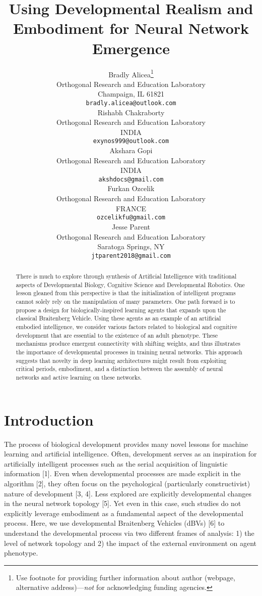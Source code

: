 \documentclass{article}
\title{Using Developmental Realism and Embodiment for Neural Network Emergence}
\author{%
  Bradly Alicea\thanks{Use footnote for providing further information
    about author (webpage, alternative address)---\emph{not} for acknowledging
    funding agencies.} \\
  Orthogonal Research and Education Laboratory\\
  Champaign, IL 61821 \\
  \texttt{bradly.alicea@outlook.com} \\
\And
  Rishabh Chakraborty \\
  Orthogonal Research and Education Laboratory \\
  INDIA \\
   \texttt{exynos999@outlook.com} \\
\And
  Akshara Gopi \\
  Orthogonal Research and Education Laboratory \\
  INDIA \\
   \texttt{akshdocs@gmail.com} \\
\And
  Furkan Ozcelik \\
  Orthogonal Research and Education Laboratory \\
  FRANCE \\
   \texttt{ozcelikfu@gmail.com} \\
\And
  Jesse Parent \\
  Orthogonal Research and Education Laboratory \\
  Saratoga Springs, NY \\
   \texttt{jtparent2018@gmail.com} \\
\AND

}
\begin{document}
\maketitle

\begin{abstract}
There is much to explore through synthesis of Artificial Intelligence with traditional aspects of Developmental Biology, Cognitive Science and Developmental Robotics. One lesson gleaned from this perspective is that the initialization of intelligent programs cannot solely rely on the manipulation of many parameters. One path forward is to propose a design for biologically-inspired learning agents that expands upon the classical Braitenberg Vehicle. Using these agents as an example of an artificial embodied intelligence, we consider various factors related to biological and cognitive development that are essential to the existence of an adult phenotype. These mechanisms produce emergent connectivity with shifting weights, and thus illustrates the importance of developmental processes in training neural networks. This approach suggests that novelty in deep learning architectures might result from exploiting critical periods, embodiment, and a distinction between the assembly of neural networks and active learning on these networks.
\end{abstract}

\section{Introduction}

The process of biological development provides many novel lessons for machine learning and artificial intelligence. Often, development serves as an inspiration for artificially intelligent processes such as the serial acquisition of linguistic information [1]. Even when developmental processes are made explicit in the algorithm [2], they often focus on the psychological (particularly constructivist) nature of development [3, 4]. Less explored are explicitly developmental changes in the neural network topology [5]. Yet even in this case, such studies do not explicitly leverage embodiment as a fundamental aspect of the developmental process. Here, we use developmental Braitenberg Vehicles (dBVs) [6] to understand the developmental process via two different frames of analysis: 1) the level of network topology and 2) the impact of the external environment on agent phenotype. 
\end{document}
